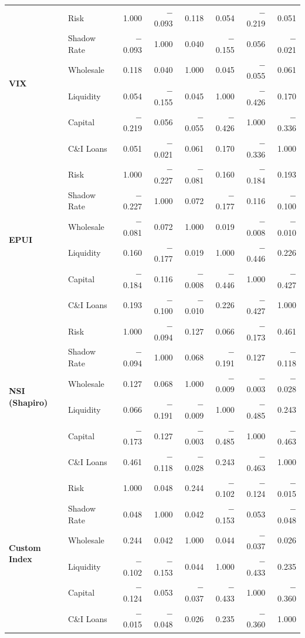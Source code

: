\documentclass[12pt,a4paper]{report}\usepackage[a4paper, top=2.5cm, bottom=2.5cm, left=2.5cm, right=2.5cm]{geometry}
\begin{document}
\begin{table}[H]
{\begin{tabular}{ll rrrrrr}
\multirow{6}{*}{\textbf{VIX}}
 & Risk          &  1.000 & $-$0.093 &  0.118 &  0.054 & $-$0.219 &  0.051 \\
 & Shadow Rate   & $-$0.093 &  1.000 &  0.040 & $-$0.155 &  0.056 & $-$0.021 \\
 & Wholesale     &  0.118 &  0.040 &  1.000 &  0.045 & $-$0.055 &  0.061 \\
 & Liquidity     &  0.054 & $-$0.155 &  0.045 &  1.000 & $-$0.426 &  0.170 \\
 & Capital       & $-$0.219 &  0.056 & $-$0.055 & $-$0.426 &  1.000 & $-$0.336 \\
 & C\&I Loans    &  0.051 & $-$0.021 &  0.061 &  0.170 & $-$0.336 &  1.000 \\
\midrule

\multirow{6}{*}{\textbf{EPUI}}
 & Risk          &  1.000 & $-$0.227 & $-$0.081 &  0.160 & $-$0.184 &  0.193 \\
 & Shadow Rate   & $-$0.227 &  1.000 &  0.072 & $-$0.177 &  0.116 & $-$0.100 \\
 & Wholesale     & $-$0.081 &  0.072 &  1.000 &  0.019 & $-$0.008 & $-$0.010 \\
 & Liquidity     &  0.160 & $-$0.177 &  0.019 &  1.000 & $-$0.446 &  0.226 \\
 & Capital       & $-$0.184 &  0.116 & $-$0.008 & $-$0.446 &  1.000 & $-$0.427 \\
 & C\&I Loans    &  0.193 & $-$0.100 & $-$0.010 &  0.226 & $-$0.427 &  1.000 \\
\midrule

\multirow{6}{*}{\textbf{NSI (Shapiro)}}
 & Risk          &  1.000 & $-$0.094 &  0.127 &  0.066 & $-$0.173 &  0.461 \\
 & Shadow Rate   & $-$0.094 &  1.000 &  0.068 & $-$0.191 &  0.127 & $-$0.118 \\
 & Wholesale     &  0.127 &  0.068 &  1.000 & $-$0.009 & $-$0.003 & $-$0.028 \\
 & Liquidity     &  0.066 & $-$0.191 & $-$0.009 &  1.000 & $-$0.485 &  0.243 \\
 & Capital       & $-$0.173 &  0.127 & $-$0.003 & $-$0.485 &  1.000 & $-$0.463 \\
 & C\&I Loans    &  0.461 & $-$0.118 & $-$0.028 &  0.243 & $-$0.463 &  1.000 \\
\midrule

\multirow{6}{*}{\textbf{Custom Index}}
 & Risk          &  1.000 &  0.048 &  0.244 & $-$0.102 & $-$0.124 & $-$0.015 \\
 & Shadow Rate   &  0.048 &  1.000 &  0.042 & $-$0.153 &  0.053 & $-$0.048 \\
 & Wholesale     &  0.244 &  0.042 &  1.000 &  0.044 & $-$0.037 &  0.026 \\
 & Liquidity     & $-$0.102 & $-$0.153 &  0.044 &  1.000 & $-$0.433 &  0.235 \\
 & Capital       & $-$0.124 &  0.053 & $-$0.037 & $-$0.433 &  1.000 & $-$0.360 \\
 & C\&I Loans    & $-$0.015 & $-$0.048 &  0.026 &  0.235 & $-$0.360 &  1.000 \\
\midrule


\end{tabular}}
\end{table}
\end{document}
